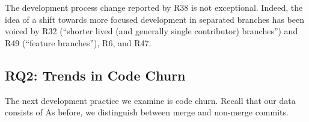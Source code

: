 The development process change reported by R38 is not exceptional. 
Indeed, the idea of a shift towards more focused development in separated 
branches has been voiced by R32 (``shorter lived (and generally single contributor) 
branches'') and R49 (``feature branches''), R6, and R47.




%





\subsection{RQ2: Trends in Code Churn}

The next development practice we examine is code churn.
Recall that our data consists of 
As before, we distinguish between merge and non-merge commits.

